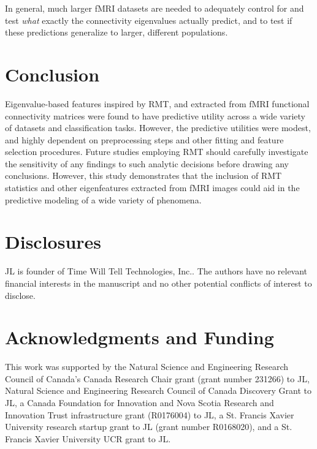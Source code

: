 \documentclass[12pt]{spieman}  %
\begin{document}
\begin{spacing}{2}
In general, much larger fMRI datasets are needed to adequately control for and
test \textit{what} exactly the connectivity eigenvalues actually predict, and
to test if these predictions generalize to larger, different populations.



\section{Conclusion}

Eigenvalue-based features inspired by RMT, and extracted from fMRI functional
connectivity matrices were found to have predictive utility across a wide
variety of datasets and classification tasks. However, the predictive utilities
were modest, and highly dependent on preprocessing steps and other fitting and
feature selection procedures. Future studies employing RMT should carefully
investigate the sensitivity of any findings to such analytic decisions before
drawing any conclusions. However, this study demonstrates that the inclusion of
RMT statistics and other eigenfeatures extracted from fMRI images could aid in
the predictive modeling of a wide variety of phenomena.



\newpage



\section*{Disclosures}
JL is founder of Time Will Tell Technologies, Inc.. The authors have no
relevant financial interests in the manuscript and no other potential conflicts
of interest to disclose.



\section*{Acknowledgments and Funding}
This work was supported by the Natural Science and Engineering Research
Council of Canada's Canada Research Chair grant (grant number 231266) to JL,
Natural Science and Engineering Research Council of Canada Discovery Grant to
JL, a Canada Foundation for Innovation and Nova Scotia Research and Innovation
Trust infrastructure grant (R0176004) to JL, a St. Francis Xavier University
research startup grant to JL (grant number R0168020), and a St. Francis Xavier
University UCR grant to JL.




\end{spacing}
\end{document}
